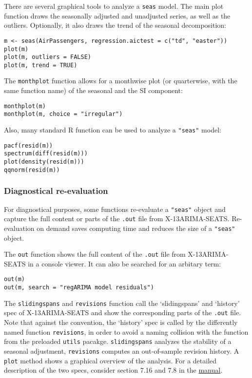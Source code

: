 There are several graphical tools to analyze a \texttt{seas} model. The
main plot function draws the seasonally adjusted and unadjusted series,
as well as the outliers. Optionally, it also draws the trend of the
seasonal decomposition:

\begin{verbatim}
m <- seas(AirPassengers, regression.aictest = c("td", "easter"))
plot(m)
plot(m, outliers = FALSE)
plot(m, trend = TRUE)
\end{verbatim}

The \texttt{monthplot} function allows for a monthwise plot (or
quarterwise, with the same function name) of the seasonal and the SI
component:

\begin{verbatim}
monthplot(m)
monthplot(m, choice = "irregular")
\end{verbatim}

Also, many standard R function can be used to analyze a \texttt{"seas"}
model:

\begin{verbatim}
pacf(resid(m))
spectrum(diff(resid(m)))
plot(density(resid(m)))
qqnorm(resid(m))
\end{verbatim}

\subsubsection{Diagnostical
re-evaluation}\label{diagnostical-re-evaluation}

For diagnostical purposes, some functions re-evaluate a \texttt{"seas"}
object and capture the full content or parts of the \texttt{.out} file
from X-13ARIMA-SEATS. Re-evaluation on demand saves computing time and
reduces the size of a \texttt{"seas"} object.

The \texttt{out} function shows the full content of the \texttt{.out}
file from X-13ARIMA-SEATS in a console viewer. It can also be searched
for an arbitary term:

\begin{verbatim}
out(m)
out(m, search = "regARIMA model residuals")
\end{verbatim}

The \texttt{slidingspans} and \texttt{revisions} function call the
`slidingspans' and `history' spec of X-13ARIMA-SEATS and show the
corresponding parts of the \texttt{.out} file. Note that against the
convention, the `history' spec is called by the differently named
function \texttt{revisions}, in order to avoid a naming collision with
the function from the preloaded \texttt{utils} pacakge.
\texttt{slidingspans} analyzes the stability of a seasonal adjustment,
\texttt{revisions} computes an out-of-sample revision history. A
\texttt{plot} method shows a graphical overview of the analysis. For a
detailed description of the two specs, consider section 7.16 and 7.8 in
the \href{http://www.census.gov/ts/x13as/docX13AS.pdf}{manual}.

